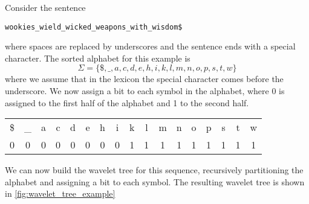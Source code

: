 \begin{example}
    Consider the sentence
    \begin{center}
        \texttt{wookies\_wield\_wicked\_weapons\_with\_wisdom\$}
    \end{center}
    where spaces are replaced by underscores and the sentence ends with a special character. The sorted alphabet for this example is
    \[
        \Sigma = \{\$, \_, a, c, d, e, h, i, k, l, m, n, o, p, s, t, w \}
    \]
    where we assume that in the lexicon the special character comes before the underscore. We now assign a bit to each symbol in the alphabet, where 0 is assigned to the first half of the alphabet and 1 to the second half. \vspace{0.4cm}

    \begin{tabular}{*{17}{c}}
        \$                        & \_                        & a                         & c                         & d                         & e                         & h                         & i                         & k                         & l                         & m                         & n                         & o                         & p                         & s                         & t                         & w                         \\
        \textcolor{purple!100}{0} & \textcolor{purple!100}{0} & \textcolor{purple!100}{0} & \textcolor{purple!100}{0} & \textcolor{purple!100}{0} & \textcolor{purple!100}{0} & \textcolor{purple!100}{0} & \textcolor{purple!100}{0} & \textcolor{purple!100}{1} & \textcolor{purple!100}{1} & \textcolor{purple!100}{1} & \textcolor{purple!100}{1} & \textcolor{purple!100}{1} & \textcolor{purple!100}{1} & \textcolor{purple!100}{1} & \textcolor{purple!100}{1} & \textcolor{purple!100}{1} \\
    \end{tabular} \vspace{0.4cm}

    \noindent We can now build the wavelet tree for this sequence, recursively partitioning the alphabet and assigning a bit to each symbol. The resulting wavelet tree is shown in \autoref{fig:wavelet_tree_example}

\end{example}

